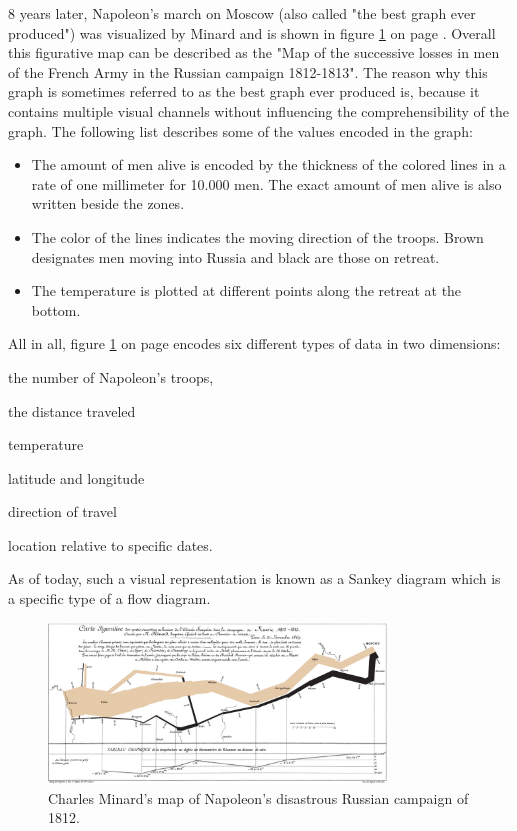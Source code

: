8 years later, Napoleon's march on Moscow (also called "the best graph ever produced") was visualized by Minard and is shown in figure \ref{fig:minard2} on page \pageref{fig:minard2}. Overall this figurative map can be described as the "Map of the successive losses in men of the French Army in the Russian campaign 1812-1813". The reason why this graph is sometimes referred to as the best graph ever produced is, because it contains multiple visual channels without influencing the comprehensibility of the graph. The following list describes some of the values encoded in the graph:
\begin{itemize}
\item The amount of men alive is encoded by the thickness of the colored lines in a rate of one millimeter for 10.000 men. The exact amount of men alive is also written beside the zones.
\item The color of the lines indicates the moving direction of the troops. Brown designates men moving into Russia and black are those on retreat.
\item The temperature is plotted at different points along the retreat at the bottom.
\end{itemize}
All in all, figure \ref{fig:minard2} on page \pageref{fig:minard2} encodes six different types of data in two dimensions:
\begin{enumerate*}
\item the number of Napoleon's troops,
\item the distance traveled
\item temperature
\item latitude and longitude
\item direction of travel
\item location relative to specific dates.
\end{enumerate*}
As of today, such a visual representation is known as a Sankey diagram which is a specific type of a flow diagram.

\begin{figure}[!htb]
\centering
\includegraphics[width=0.8\textwidth,keepaspectratio]{images/history/minard2.png}
\caption[
    Charles Minard's map of Napoleon's disastrous Russian campaign of 1812., Urldate: 07.2016 \newline
\small\texttt{\url{https://upload.wikimedia.org/wikipedia/commons/2/29/Minard.png}}
]{Charles Minard's map of Napoleon's disastrous Russian campaign of 1812.}
\label{fig:minard2}
\end{figure}


